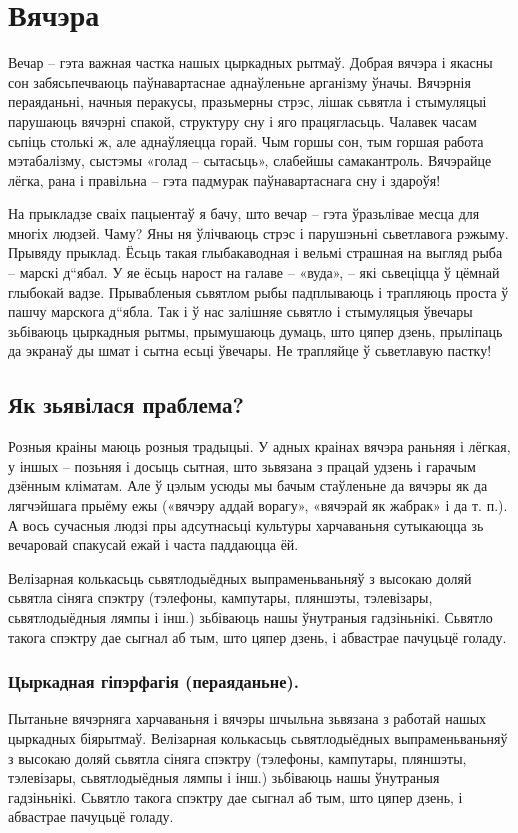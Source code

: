 \chapter{Вячэра}

Вечар – гэта важная частка нашых цыркадных рытмаў. Добрая вячэра і якасны сон забясьпечваюць паўнавартаснае аднаўленьне арганізму ўначы. Вячэрнія пераяданьні, начныя перакусы, празьмерны стрэс, лішак сьвятла і стымуляцыі парушаюць вячэрні спакой, структуру сну і яго працягласьць. Чалавек часам сьпіць столькі ж, але аднаўляецца горай. Чым горшы сон, тым горшая работа мэтабалізму, сыстэмы «голад – сытасьць», слабейшы самакантроль. Вячэрайце лёгка, рана і правільна – гэта падмурак паўнавартаснага сну і здароўя!

На прыкладзе сваіх пацыентаў я бачу, што вечар – гэта ўразьлівае месца для многіх людзей. Чаму? Яны ня ўлічваюць стрэс і парушэньні сьветлавога рэжыму. Прывяду прыклад. Ёсьць такая глыбакаводная і вельмі страшная на выгляд рыба – марскі д“ябал. У яе ёсьць нарост на галаве – «вуда», – які сьвеціцца ў цёмнай глыбокай вадзе. Прывабленыя сьвятлом рыбы падплываюць і трапляюць проста ў пашчу марскога д“ябла. Так і ў нас залішняе сьвятло і стымуляцыя ўвечары зьбіваюць цыркадныя рытмы, прымушаюць думаць, што цяпер дзень, прыліпаць да экранаў ды шмат і сытна есьці ўвечары. Не трапляйце ў сьветлавую пастку!

\section{Як зьявілася праблема?}

Розныя краіны маюць розныя традыцыі. У адных краінах вячэра раньняя і лёгкая, у іншых – позьняя і досыць сытная, што зьвязана з працай удзень і гарачым дзённым кліматам. Але ў цэлым усюды мы бачым стаўленьне да вячэры як да лягчэйшага прыёму ежы («вячэру аддай ворагу», «вячэрай як жабрак» і да т. п.). А вось сучасныя людзі пры адсутнасьці культуры харчаваньня сутыкаюцца зь вечаровай спакусай ежай і часта паддаюцца ёй.

Велізарная колькасьць сьвятлодыёдных выпраменьваньняў з высокаю доляй сьвятла сіняга спэктру (тэлефоны, кампутары, пляншэты, тэлевізары, сьвятлодыёдныя лямпы і інш.) зьбіваюць нашы ўнутраныя гадзіньнікі. Сьвятло такога спэктру дае сыгнал аб тым, што цяпер дзень, і абвастрае пачуцьцё голаду.

\subsection{Цыркадная гіпэрфагія (пераяданьне).}
Пытаньне вячэрняга харчаваньня і вячэры шчыльна зьвязана з работай нашых цыркадных біярытмаў. Велізарная колькасьць сьвятлодыёдных выпраменьваньняў з высокаю доляй сьвятла сіняга спэктру (тэлефоны, кампутары, пляншэты, тэлевізары, сьвятлодыёдныя лямпы і інш.) зьбіваюць нашы ўнутраныя гадзіньнікі. Сьвятло такога спэктру дае сыгнал аб тым, што цяпер дзень, і абвастрае пачуцьцё голаду.


